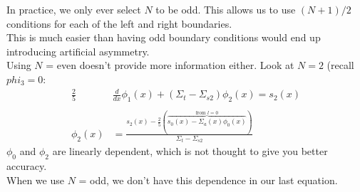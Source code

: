 \documentclass[12pt]{article}
\begin{document}
In practice, we only ever select $N$ to be odd. This allows us to use $(N+1)/2$ conditions for each of the left and right boundaries. \\
This is much easier than having odd boundary conditions would end up introducing artificial asymmetry. \\
Using $N$ = even doesn't provide more information either. Look at $N=2$ (recall $phi_3 = 0$:
\begin{align*}
\frac{2}{5}&\frac{d}{dx}\phi_1(x) +(\Sigma_t - \Sigma_{s2})\phi_2(x) = s_2(x)\\
&\\
\phi_2(x) &= \frac{s_2(x) - \frac{2}{5}(\overbrace{s_0(x) - \Sigma_a(x)\phi_0(x)}^{\text{from }l=0})}{\Sigma_t - \Sigma_{s2}}
\end{align*}
$\phi_0$ and $\phi_2$ are linearly dependent, which is not thought to give you better accuracy.\\
When we use $N$ = odd, we don't have this dependence in our last equation. 
\end{document}
